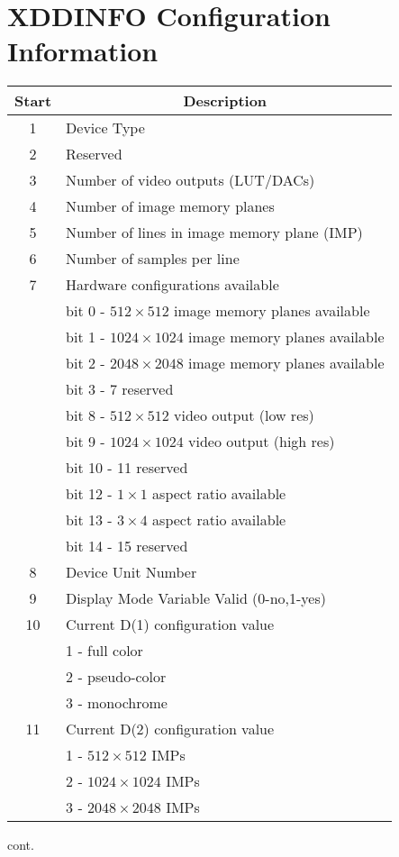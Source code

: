 \section{XDDINFO Configuration Information}
\begin{tabular}{|c|l|}
\hline
\multicolumn{1}{|c|}{Start}
&\multicolumn{1}{|c|}{Description}\\ \hline
1 & Device Type\\
2 & Reserved\\
3 & Number of video outputs  (LUT/DACs)\\
4 & Number of image memory planes\\
5 & Number of lines in image memory plane (IMP)\\
6 & Number of samples per line\\
7 & Hardware configurations available\\
& bit  0 -  $512 \times 512$  image memory planes available\\
& bit  1 - $1024 \times 1024$ image memory planes available\\
& bit  2 - $2048 \times 2048$ image memory planes available\\
& bit  3 - 7 reserved\\
& bit  8 -  $512 \times 512$  video output  (low res)\\
& bit  9 - $1024 \times 1024$ video output  (high res)\\
& bit 10 - 11 reserved\\
& bit 12 - $1 \times 1$ aspect ratio available\\
& bit 13 - $3 \times 4$ aspect ratio available\\
& bit 14 - 15 reserved\\
8 & Device Unit Number\\
9 & Display Mode Variable Valid (0-no,1-yes)\\
10 & Current D(1) configuration value\\
& 1 - full color\\
& 2 - pseudo-color\\
& 3 - monochrome\\
11 & Current D(2) configuration value\\
 & 1 - $512 \times 512$ IMPs\\
 & 2 - $1024 \times 1024$ IMPs\\
 & 3 - $2048 \times 2048$ IMPs\\ \hline
\end{tabular}
\newpage
cont.


